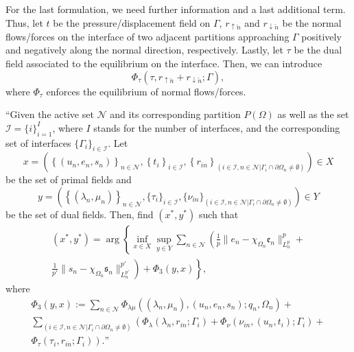 For the last formulation, we need further information and a last additional term. Thus, let $t$ be the pressure/displacement field on $\Gamma$, $r_{\uparrow\check{n}}$ and $r_{\downarrow\check{n}}$ be the normal flows/forces on the interface of two
adjacent partitions approaching $\Gamma$ positively and negatively along the normal direction, respectively. Lastly, let $\tau$ be the dual field associated to the equilibrium on the interface. Then, we can introduce
\begin{equation}
\Phi_{\tau}(\tau,r_{\uparrow \check{n}}+r_{\downarrow \check{n}};\Gamma),    
\end{equation}
where $\Phi_{\tau}$ enforces the equilibrium of normal flows/forces.

\begin{problem}[NLSP3]
\hspace{-2mm}``Given the active set $\mathcal{N}$ and its corresponding partition $P(\Omega)$ as well as the set $\mathcal{I} = \{i\}_{i=1}^I$, where $I$ stands for the number of interfaces, and the corresponding set of interfaces $\{\Gamma_i\}_{i \in \mathcal{I}}$. Let 
\begin{equation}
x = 
\left(
\left\lbrace (u_n,e_n,s_n) \right\rbrace_{n\in\mathcal{N}},
\left\lbrace t_i \right\rbrace_{i \in \mathcal{I}},
\left\lbrace r_{in} \right\rbrace_{\left(i \in \mathcal{I}, n \in \mathcal{N}| \Gamma_i \cap \partial \Omega_n \neq \emptyset \right)}
\right) \in X
\end{equation}
be the set of primal fields and
\begin{equation}
y =
\left(
\left\lbrace (\lambda_n,\mu_n) \right\rbrace_{n \in \mathcal{N}},
\{\tau_i\}_{i\in \mathcal{I}},
\{\nu_{in}\}_{\left(i\in \mathcal{I}, n \in \mathcal{N}| \Gamma_i \cap \partial \Omega_n \neq \emptyset \right)}
\right) \in Y
\end{equation}
be the set of dual fields.
Then, find $(x^*, y^*)$ such that
\begin{multline}
(x^*, y^*) =
\arg
\left\{
\inf_{x \in X}
\sup_{y \in Y}
\sum_{n \in \mathcal{N}}
\left(
\frac{1}{p}\|e_n-\chi_{\Omega_n}\mathfrak{e}_n\|^{p}_{L^p_n}+
\right.
\right.
\\
\left.
\left.
\frac{1}{p'}\|s_n-\chi_{\Omega_n}\mathfrak{s}_n\|^{p'}_{L^{p'}_n}
\right)+
\Phi_3(y,x)
\right\},
\end{multline}
where
\begin{multline}
\Phi_3(y,x) :=   
\sum_{n \in \mathcal{N}}
\Phi_{\lambda\mu}((\lambda_n,\mu_n),(u_n,e_n,s_n);q_n,\Omega_n)
+\\
\sum_{\left( i \in \mathcal{I}, n \in \mathcal{N}| \Gamma_i \cap \partial \Omega_n \neq \emptyset \right)} 
\left(
\Phi_{\lambda}(\lambda_{n}, r_{i n};\Gamma_i)
+
\Phi_{\nu}(\nu_{i n},(u_n, t_i);\Gamma_i)
+
\right.
\\
\left.
\Phi_{\tau}(\tau_i,r_{i n};\Gamma_i)
\right). \textrm{''}
\end{multline}
\end{problem}

